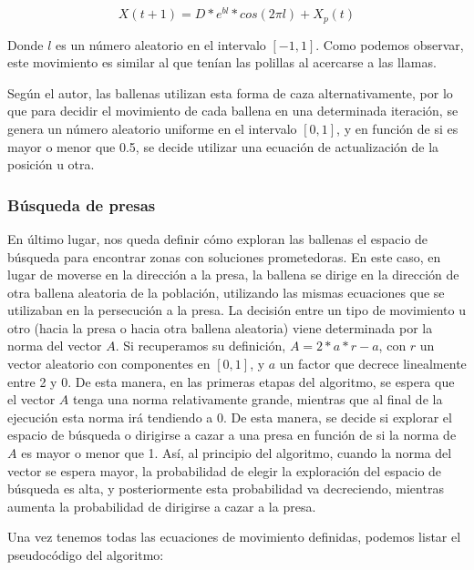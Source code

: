 \documentclass[
  a4paper,
,tablecaptionabove
]{scrartcl}
\begin{document}
\[ X (t+1) = D* e^{bl}*cos(2 \pi l) + X_p(t) \]

Donde \(l\) es un número aleatorio en el intervalo \([-1,1]\). Como
podemos observar, este movimiento es similar al que tenían las polillas
al acercarse a las llamas.

Según el autor, las ballenas utilizan esta forma de caza
alternativamente, por lo que para decidir el movimiento de cada ballena
en una determinada iteración, se genera un número aleatorio uniforme en
el intervalo \([0,1]\), y en función de si es mayor o menor que 0.5, se
decide utilizar una ecuación de actualización de la posición u otra.

\hypertarget{buxfasqueda-de-presas}{%
\subsubsection{Búsqueda de presas}\label{buxfasqueda-de-presas}}

En último lugar, nos queda definir cómo exploran las ballenas el espacio
de búsqueda para encontrar zonas con soluciones prometedoras. En este
caso, en lugar de moverse en la dirección a la presa, la ballena se
dirige en la dirección de otra ballena aleatoria de la población,
utilizando las mismas ecuaciones que se utilizaban en la persecución a
la presa. La decisión entre un tipo de movimiento u otro (hacia la presa
o hacia otra ballena aleatoria) viene determinada por la norma del
vector \(A\). Si recuperamos su definición, \(A = 2*a*r - a\), con \(r\)
un vector aleatorio con componentes en \([0,1]\), y \(a\) un factor que
decrece linealmente entre 2 y 0. De esta manera, en las primeras etapas
del algoritmo, se espera que el vector \(A\) tenga una norma
relativamente grande, mientras que al final de la ejecución esta norma
irá tendiendo a 0. De esta manera, se decide si explorar el espacio de
búsqueda o dirigirse a cazar a una presa en función de si la norma de
\(A\) es mayor o menor que 1. Así, al principio del algoritmo, cuando la
norma del vector se espera mayor, la probabilidad de elegir la
exploración del espacio de búsqueda es alta, y posteriormente esta
probabilidad va decreciendo, mientras aumenta la probabilidad de
dirigirse a cazar a la presa.

Una vez tenemos todas las ecuaciones de movimiento definidas, podemos
listar el pseudocódigo del algoritmo:
\end{document}
